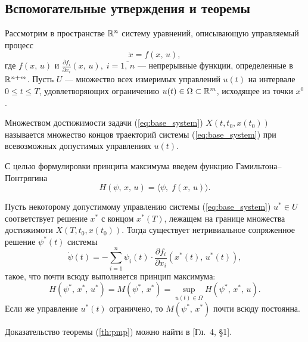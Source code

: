 \subsection{Вспомогательные утверждения и теоремы}

Рассмотрим в пространстве $\mathbb{R}^n$ систему уравнений, описывающую управляемый процесс
\begin{equation} \label{eq:base_system}
\dot x = f(x,\,u),
\end{equation}
где $f(x,\,u)$ и $\frac{\partial f_i}{\partial x_i}(x,\,u),\; i=\overline{1,\,n}$ --- непрерывные функции, определенные в $\mathbb{R}^{n+m}$. Пусть $U$ --- множество всех измеримых управлений $u(t)$ на интервале $0 \leqslant t \leqslant T$, удовлетворяющих ограничению $u(t) \in \Omega \subset \mathbb{R}^m$, исходящее из точки $x^0$.

\theoremstyle{definition}
\begin{definition}
        Множеством достижимости задачи (\ref{eq:base_system}) $X(t, t_0, x(t_0))$ называется множество концов траекторий системы (\ref{eq:base_system}) при всевозможных допустимых управлениях $u(t)$.
\end{definition}
С целью формулировки принципа максимума введем функцию Гамильтона--Понтрягина
$$
        H(\psi,\,x,\,u) = \langle \psi,\; f(x,\,u) \rangle.
$$

\begin{theorem} \label{th:pmp}
        Пусть некоторому допустимому управлению системы (\ref{eq:base_system}) $u^* \in U$ соответствует решение $x^*$ с концом $x^*(T)$, лежащем на границе множества достижимоти $X(T, t_0, x(t_0))$. Тогда существует нетривиальное сопряженное решение $\psi^*(t)$ системы
        $$
                \dot \psi(t) = -\sum\limits_{i=1}^{n}\psi_i(t)\cdot\frac{\partial f_i}{\partial x_i} (x^*(t),\,u^*(t)),
        $$
        такое, что почти всюду выполняется принцип максимума:
        $$
                H(\psi^*,\,x^*,\,u^*) = M(\psi^*,\,x^*) = \sup\limits_{u(t) \in \Omega} H(\psi^*,\,x^*,\,u).
        $$
        Если же управление $u^*(t)$ ограничено, то $M(\psi^*,\,x^*)$ почти всюду постоянна.
\end{theorem}

Доказательство теоремы (\ref{th:pmp}) можно найти в \cite{li72}[Гл.~4, \S1].